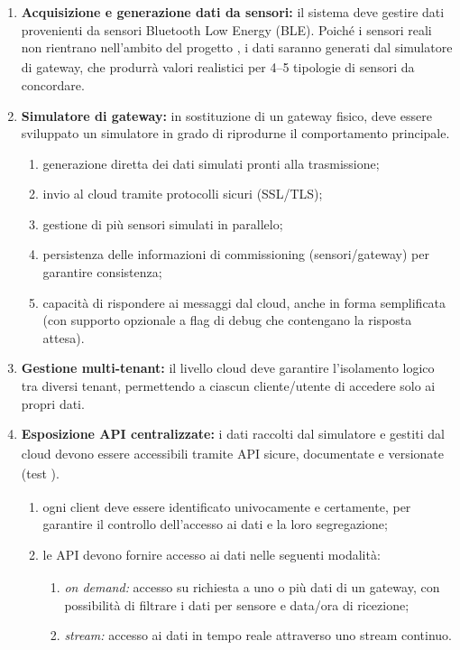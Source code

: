 \documentclass[a4paper,11pt]{article}
\begin{document}
\begin{enumerate}[noitemsep, topsep=0pt]
 \item \textbf{Acquisizione e generazione dati da sensori:} il sistema deve gestire dati provenienti da sensori Bluetooth Low Energy (BLE). Poiché i sensori reali non rientrano nell'ambito del progetto\textsubscript{}
, i dati saranno generati dal simulatore di gateway, che produrrà valori realistici per 4--5 tipologie di sensori da concordare.

 \item \textbf{Simulatore di gateway:} in sostituzione di un gateway fisico, deve essere sviluppato un simulatore 
 in grado di riprodurne il comportamento principale.
 \begin{enumerate}
  \item generazione diretta dei dati simulati pronti alla trasmissione;
  \item invio al cloud tramite protocolli sicuri (SSL/TLS);
  \item gestione di più sensori simulati in parallelo;
  \item persistenza delle informazioni di commissioning (sensori/gateway) per garantire consistenza;
  \item capacità di rispondere ai messaggi dal cloud, anche in forma semplificata 
  (con supporto opzionale a flag di debug che contengano la risposta attesa).
 \end{enumerate}

 \item \textbf{Gestione multi-tenant:} il livello cloud deve garantire l'isolamento logico tra diversi tenant, 
 permettendo a ciascun cliente/utente di accedere solo ai propri dati.

 \item \textbf{Esposizione API\textsubscript{}
 centralizzate:} i dati raccolti dal simulatore e gestiti dal cloud devono essere accessibili 
 tramite API\textsubscript{}
 sicure, documentate e versionate (test\textsubscript{}
).
 \begin{enumerate}
  \item ogni client deve essere identificato univocamente e certamente, per garantire il controllo 
  dell'accesso ai dati e la loro segregazione;
  \item le API\textsubscript{}
 devono fornire accesso ai dati nelle seguenti modalità:
  \begin{enumerate}
   \item \textit{on demand:} accesso su richiesta a uno o più dati di un gateway, 
   con possibilità di filtrare i dati per sensore e data/ora di ricezione;
   \item \textit{stream:} accesso ai dati in tempo reale attraverso uno stream continuo.
  \end{enumerate}
 \end{enumerate}


\end{enumerate}
\end{document}

